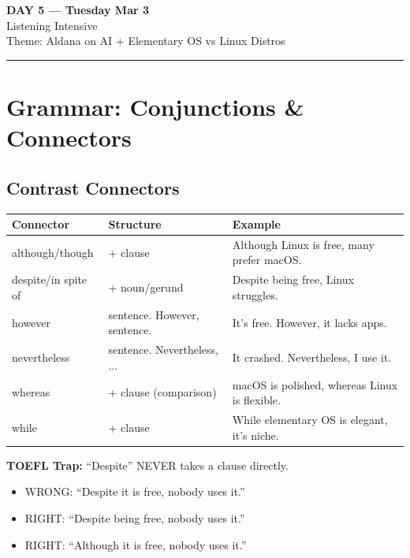 \documentclass[10pt,a4paper]{article}
\begin{document}
\begin{center}
{\LARGE \textbf{DAY 5 --- Tuesday Mar 3}}\\[4pt]
{\large Listening Intensive}\\[2pt]
{\normalsize Theme: Aldana on AI + Elementary OS vs Linux Distros}\\[2pt]
\rule{\textwidth}{0.8pt}
\end{center}

\section*{Grammar: Conjunctions \& Connectors}

\subsection*{Contrast Connectors}

\begin{center}
\begin{tabular}{lll}
\toprule
\textbf{Connector} & \textbf{Structure} & \textbf{Example} \\
\midrule
although/though & + clause & Although Linux is free, many prefer macOS. \\
despite/in spite of & + noun/gerund & Despite being free, Linux struggles. \\
however & sentence. However, sentence. & It's free. However, it lacks apps. \\
nevertheless & sentence. Nevertheless, ... & It crashed. Nevertheless, I use it. \\
whereas & + clause (comparison) & macOS is polished, whereas Linux is flexible. \\
while & + clause & While elementary OS is elegant, it's niche. \\
\bottomrule
\end{tabular}
\end{center}

\textbf{TOEFL Trap:} ``Despite'' NEVER takes a clause directly.
\begin{itemize}[nosep]
\item WRONG: ``Despite it is free, nobody uses it.''
\item RIGHT: ``Despite being free, nobody uses it.''
\item RIGHT: ``Although it is free, nobody uses it.''
\end{itemize}
\end{document}
